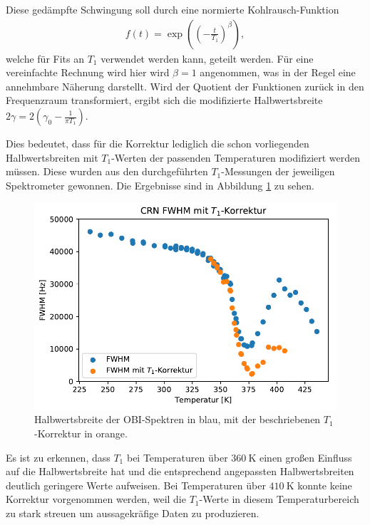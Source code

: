 Diese gedämpfte Schwingung soll durch eine normierte Kohlrausch-Funktion
\begin{align}
	f(t) = \exp{\left( {\left(-\frac{t}{T_1} \right)}^\beta \right) },
\end{align}
welche für Fits an $T_1$ verwendet werden kann, geteilt werden. Für eine vereinfachte Rechnung wird hier wird $\beta = 1$ angenommen, was in der Regel eine annehmbare Näherung darstellt. Wird der Quotient der Funktionen zurück in den Frequenzraum transformiert, ergibt sich die modifizierte Halbwertsbreite $2\gamma = 2(\gamma_0 - \frac{1}{\pi T_1})$.

Dies bedeutet, dass für die Korrektur lediglich die schon vorliegenden Halbwertsbreiten mit $T_1$-Werten der passenden Temperaturen modifiziert werden müssen. Diese wurden aus den durchgeführten $T_1$-Messungen der jeweiligen Spektrometer gewonnen. Die Ergebnisse sind in Abbildung \ref{fig:res:spek_fwhm_t1} zu sehen.
\begin{figure}
	\begin{center}
		\includegraphics[width=.9\textwidth]{graphics/plots/SPEK/spek_t1korr.pdf}
	\end{center}
	\caption{Halbwertsbreite der OBI-Spektren in blau, mit der beschriebenen $T_1$-Korrektur in orange.} \label{fig:res:spek_fwhm_t1}
\end{figure}

Es ist zu erkennen, dass $T_1$ bei Temperaturen über $\SI{360}{\kelvin}$ einen großen Einfluss auf die Halbwertsbreite hat und die entsprechend angepassten Halbwertsbreiten deutlich geringere Werte aufweisen. Bei Temperaturen über $\SI{410}{\kelvin}$ konnte keine Korrektur vorgenommen werden, weil die $T_1$-Werte in diesem Temperaturbereich zu stark streuen um aussagekräfige Daten zu produzieren.





